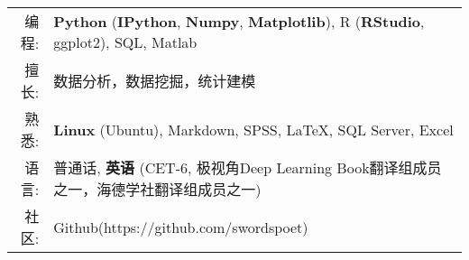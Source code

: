 %
%
%

\renewcommand{\arraystretch}{1.1}

	\begin{tabular}{>{}r>{}p{13cm}} 
		\textsc{编程:}  		&   \textbf{Python} (\textbf{IPython}, \textbf{Numpy}, \textbf{Matplotlib}), R (\textbf{RStudio}, ggplot2), SQL, Matlab\\ 
		\textsc{擅长:}          &   数据分析，数据挖掘，统计建模\\ 
		\textsc{熟悉:}          &   \textbf{Linux} (Ubuntu), Markdown, SPSS, LaTeX, SQL Server, Excel\\
		\textsc{语言:}		    &   普通话, \textbf{英语} (CET-6, 极视角Deep Learning Book翻译组成员之一，海德学社翻译组成员之一)\\
		\textsc{社区:}	        &   Github(https://github.com/swordspoet) \\ 
	\end{tabular}